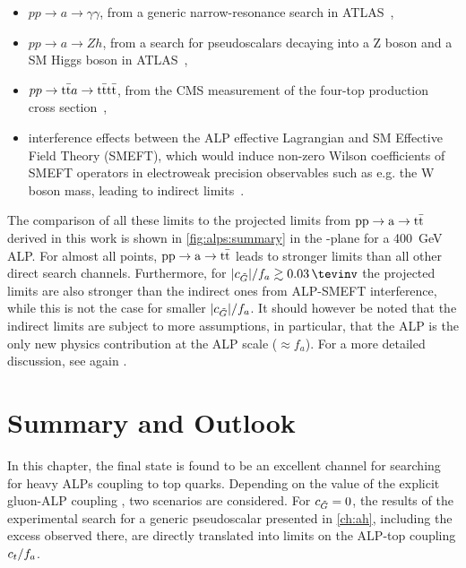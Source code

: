 \enlargethispage{\baselineskip}

\begin{itemize}
    \item $p p \rightarrow a \rightarrow \gamma \gamma$, from a generic narrow-resonance search in ATLAS~\cite{ATLAS:2021uiz},

    \item $p p \rightarrow a \rightarrow Z h$, from a search for pseudoscalars decaying into a Z boson and a SM Higgs boson in ATLAS~\cite{ATLAS:2022enb},

    \item $p p \rightarrow \mathrm{t \bar{t}} a \rightarrow \mathrm{t \bar{t}} \mathrm{t \bar{t}}$, from the CMS measurement of the four-top production cross section~\cite{CMS:2023ftu},

    \item interference effects between the ALP effective Lagrangian and SM Effective Field Theory (SMEFT), which would induce non-zero Wilson coefficients of SMEFT operators in electroweak precision observables such as e.g. the W boson mass, leading to indirect limits~\cite{Biekotter:2023mpd}.
\end{itemize}

The comparison of all these limits to the projected limits from $\mathrm{pp \rightarrow a \rightarrow \mathrm{t \bar{t}}}$ derived in this work is shown in \cref{fig:alps:summary} in the \ct-\cG plane for a \SI{400}{\GeV} ALP. For almost all points, $\mathrm{pp \rightarrow a \rightarrow \mathrm{t \bar{t}}}$ leads to stronger limits than all other direct search channels. Furthermore, for $|\cG|/f_a \gtrsim \SI{0.03}{\tevinv}$ the projected limits are also stronger than the indirect ones from ALP-SMEFT interference, while this is not the case for smaller $|c_{\tilde{G}}|/f_a$. It should however be noted that the indirect limits are subject to more assumptions, in particular, that the ALP is the only new physics contribution at the ALP scale ($\approx f_a$). For a more detailed discussion, see again .

\newpage

\section{Summary and Outlook}
\label{sec:alps:summary}

In this chapter, the \ttbar final state is found to be an excellent channel for searching for heavy ALPs coupling to top quarks. Depending on the value of the explicit gluon-ALP coupling \cG, two scenarios are considered. For $c_{\tilde{G}} = 0$, the results of the experimental search for a generic pseudoscalar presented in \cref{ch:ah}, including the excess observed there,  are directly translated into limits on the ALP-top coupling $c_t/f_a$. 


